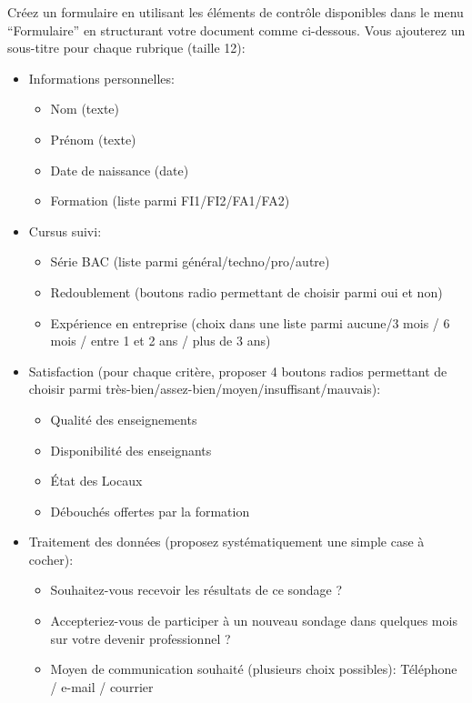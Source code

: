 \documentclass[a4paper, 9pt]{article}
\begin{document}
\exost Cr\'eez un formulaire en utilisant les \'el\'ements de contr\^ole disponibles dans le menu ``Formulaire'' en structurant votre document
comme ci-dessous. Vous ajouterez un sous-titre pour chaque rubrique (taille 12):
%
\begin{itemize}
 \item Informations personnelles: 
 \begin{itemize}
  \item Nom (texte)
  \item Pr\'enom (texte)
  \item Date de naissance (date)
  \item Formation (liste parmi FI1/FI2/FA1/FA2)
 \end{itemize}
  \item Cursus suivi: 
  \begin{itemize}
    \item S\'erie BAC (liste parmi g\'en\'eral/techno/pro/autre)
    \item Redoublement (boutons radio permettant de choisir parmi oui et non)
    \item Exp\'erience en entreprise (choix dans une liste parmi aucune/3 mois / 6 mois / entre 1 et 2 ans / plus de 3 ans)
  \end{itemize}
 \item Satisfaction (pour chaque crit\`ere, proposer 4 boutons radios permettant de choisir parmi  tr\`es-bien/assez-bien/moyen/insuffisant/mauvais):
 \begin{itemize}
  \item Qualit\'e des enseignements
  \item Disponibilit\'e des enseignants
  \item \'Etat des Locaux
  \item D\'ebouch\'es offertes par la formation
  \end{itemize}
  \item Traitement des donn\'ees (proposez syst\'ematiquement une simple case \`a cocher):
  \begin{itemize}
    \item Souhaitez-vous recevoir les r\'esultats de ce sondage ?
    \item Accepteriez-vous de participer \`a un nouveau sondage dans quelques mois sur votre devenir professionnel ?
    \item Moyen de communication souhait\'e (plusieurs choix possibles): T\'el\'ephone / e-mail / courrier 
  \end{itemize}
 \end{itemize}
\end{document}

